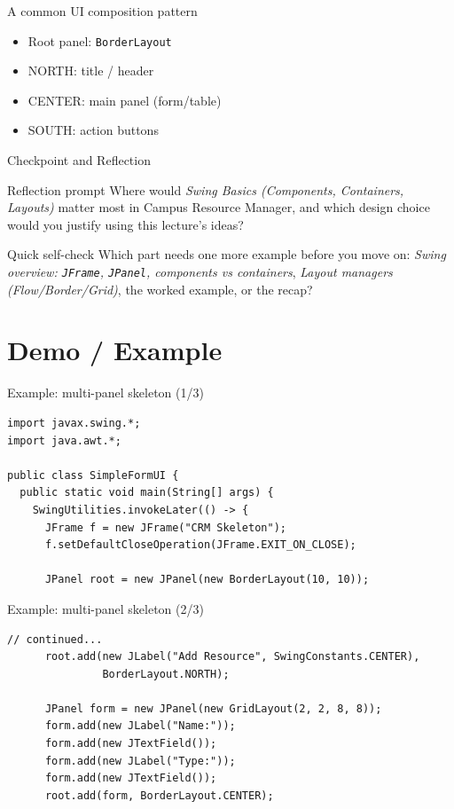 \documentclass{beamer}
\begin{document}
\begin{frame}{A common UI composition pattern}
  \begin{itemize}[<+->]
    \item Root panel: \texttt{BorderLayout}
    \item NORTH: title / header
    \item CENTER: main panel (form/table)
    \item SOUTH: action buttons
  \end{itemize}
  \slidesources{\OOPSUnitIVSources}
\end{frame}

\begin{frame}{Checkpoint and Reflection}
\begin{block}{Reflection prompt}
Where would \textit{Swing Basics (Components, Containers, Layouts)} matter most in Campus Resource Manager, and which design choice would you justify using this lecture's ideas?
\end{block}
\begin{block}{Quick self-check}
Which part needs one more example before you move on: \textit{Swing overview: \texttt{JFrame}, \texttt{JPanel}, components vs containers}, \textit{Layout managers (Flow/Border/Grid)}, the worked example, or the recap?
\end{block}
  \slidesources{\OOPSUnitIVSources}
\end{frame}

\section{Demo / Example}
\label{sec:demo}

\begin{frame}[fragile]{Example: multi-panel skeleton (1/3)}
\begin{lstlisting}
import javax.swing.*;
import java.awt.*;

public class SimpleFormUI {
  public static void main(String[] args) {
    SwingUtilities.invokeLater(() -> {
      JFrame f = new JFrame("CRM Skeleton");
      f.setDefaultCloseOperation(JFrame.EXIT_ON_CLOSE);

      JPanel root = new JPanel(new BorderLayout(10, 10));
\end{lstlisting}
  \slidesources{\OOPSUnitIVSources}
\end{frame}

\begin{frame}[fragile]{Example: multi-panel skeleton (2/3)}
\begin{lstlisting}
// continued...
      root.add(new JLabel("Add Resource", SwingConstants.CENTER),
               BorderLayout.NORTH);

      JPanel form = new JPanel(new GridLayout(2, 2, 8, 8));
      form.add(new JLabel("Name:"));
      form.add(new JTextField());
      form.add(new JLabel("Type:"));
      form.add(new JTextField());
      root.add(form, BorderLayout.CENTER);
\end{lstlisting}
  \slidesources{\OOPSUnitIVSources}
\end{frame}
\end{document}
